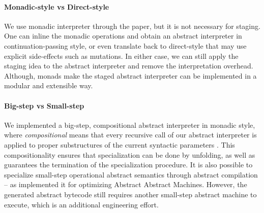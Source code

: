 \paragraph{Monadic-style vs Direct-style} We use monadic interpreter through the paper,
but it is not necessary for staging. One can inline the monadic
operations and obtain an abstract interpreter in continuation-passing
style, or even translate back to direct-style that may use explicit
side-effects such as mutations. In either case, we can still apply the
staging idea to the abstract interpreter and remove the interpretation
overhead. Although, monads make the staged abstract interpreter can be
implemented in a modular and extensible way.

\paragraph{Big-step vs Small-step}

We implemented a big-step, compositional abstract interpreter in monadic
style, where \textit{compositional} means that every recursive call of our abstract
interpreter is applied to proper substructures of the current syntactic
parameters \cite{10.1007/3-540-61580-6_11}. This compositionality ensures that
specialization can be done by unfolding, as well as guarantees the termination
of the specialization procedure. It is also possible to specialize small-step
operational abstract semantics through abstract compilation
\cite{Boucher:1996:ACN:647473.727587} -- as
\citet{Johnson:2013:OAA:2500365.2500604} implemented it for
optimizing Abstract Abstract Machines. However, the generated abstract
bytecode still requires another small-step abstract machine to execute, which is
an additional engineering effort.
